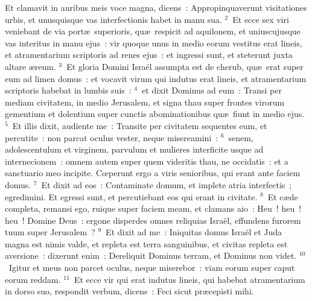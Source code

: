 \bchapter
\lettrine[lines=3,image=true,loversize=0.05,lraise=-0.03]{E}{}t clamavit in auribus meis voce magna, dicens~: Appropinquaverunt visitationes urbis, et unusquisque vas interfectionis habet in manu sua.
${}^{2}$~Et ecce sex viri veniebant de via port\ae\ superioris, qu\ae\ respicit ad aquilonem, et uniuscujusque vas interitus in manu ejus~: vir quoque unus in medio eorum vestitus erat lineis, et atramentarium scriptoris ad renes ejus~: et ingressi sunt, et steterunt juxta altare \ae reum.
${}^{3}$~Et gloria Domini Isra\"el assumpta est de cherub, qu\ae\ erat super eum ad limen domus~: et vocavit virum qui indutus erat lineis, et atramentarium scriptoris habebat in lumbis suis~:
${}^{4}$~et dixit Dominus ad eum~: Transi per mediam civitatem, in medio Jerusalem, et signa thau super frontes virorum gementium et dolentium super cunctis abominationibus qu\ae\ fiunt in medio ejus.
${}^{5}$~Et illis dixit, audiente me~: Transite per civitatem sequentes eum, et percutite~: non parcat oculus vester, neque misereamini~:
${}^{6}$~senem, adolescentulum et virginem, parvulum et mulieres interficite usque ad internecionem~: omnem autem super quem videritis thau, ne occidatis~: et a sanctuario meo incipite. Cœperunt ergo a viris senioribus, qui erant ante faciem domus.
${}^{7}$~Et dixit ad eos~: Contaminate domum, et implete atria interfectis~; egredimini. Et egressi sunt, et percutiebant eos qui erant in civitate.
${}^{8}$~Et c\ae de completa, remansi ego, ruique super faciem meam, et clamans aio~: Heu~! heu~! heu~! Domine Deus~: ergone disperdes omnes reliquias Isra\"el, effundens furorem tuum super Jerusalem~?
${}^{9}$~Et dixit ad me~: Iniquitas domus Isra\"el et Juda magna est nimis valde, et repleta est terra sanguinibus, et civitas repleta est aversione~: dixerunt enim~: Dereliquit Dominus terram, et Dominus non videt.
${}^{10}$~Igitur et meus non parcet oculus, neque miserebor~: viam eorum super caput eorum reddam.
${}^{11}$~Et ecce vir qui erat indutus lineis, qui habebat atramentarium in dorso suo, respondit verbum, dicens~: Feci sicut pr\ae cepisti mihi.

